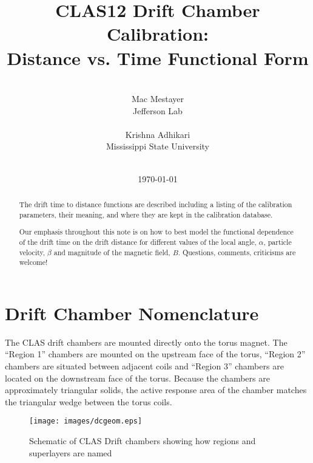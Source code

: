 \documentclass{article}
\begin{document}
\title{CLAS12 Drift Chamber Calibration:\\
Distance vs. Time Functional Form}
\author{
\vspace{5cm}\\
Mac Mestayer\\
Jefferson Lab\\
\vspace{0.20cm}\\
Krishna Adhikari\\
Mississippi State University\\
\vspace{0.3cm}\\
}
\date{\today}
\maketitle

\begin{abstract}

The drift time to distance functions are described including a listing of
the calibration parameters, their meaning, and where they are
kept in the calibration database.  

Our emphasis throughout this note is on how to best model
the functional dependence of the drift time on the drift
distance for different values of the local angle, $\alpha$,
particle velocity, $\beta$ and magnitude of the magnetic field,
$B$. Questions, comments, criticisms are welcome!

\end{abstract}
\pagebreak

\tableofcontents




\section{Drift Chamber Nomenclature}
\label{sec:nomenclature}
The CLAS drift chambers are mounted directly onto the torus magnet. 
The ``Region 1'' chambers are mounted on the upstream face of the
torus, ``Region 2'' chambers are situated between adjacent coils and
``Region 3'' chambers are located on the downstream face of the torus.
Because the chambers are approximately triangular solids, the active
response area of the chamber matches the triangular wedge between the
torus coils.

\begin{figure}[hbt]
\centering
\texttt{[image: images/dcgeom.eps]}
\caption{Schematic of CLAS Drift chambers showing how regions and 
superlayers are named}
\label{fig:dcgeom}
\end{figure}
\end{document}
